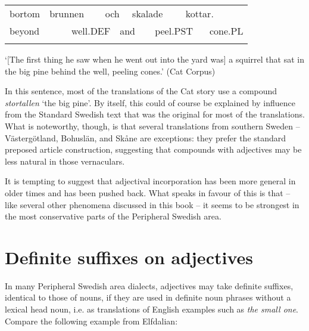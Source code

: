 \begin{tabular}{llllllllll}
\lsptoprule
bortom & \multicolumn{2}{l}{brunnen

} & \multicolumn{2}{l}{och

} & \multicolumn{2}{l}{skalade

} & \multicolumn{2}{l}{kottar.

} & \\
\multicolumn{2}{l}{beyond

} & \multicolumn{2}{l}{well.DEF

} & \multicolumn{2}{l}{and

} & \multicolumn{2}{l}{peel.PST

} & \multicolumn{2}{l}{cone.PL

}\\
\lspbottomrule
\end{tabular}

\begin{styleTranslation}
‘[The first thing he saw when he went out into the yard was] a squirrel that sat in the big pine behind the well, peeling cones.’ (Cat Corpus)

\end{styleTranslation}

\begin{styleBodyTextFirst}
In this sentence, most of the translations of the Cat story use a compound \textit{stortallen} ‘the big pine’. By itself, this could of course be explained by influence from the Standard Swedish text that was the original for most of the translations. What is noteworthy, though, is that several translations from southern Sweden – Västergötland, Bohuslän, and Skåne are exceptions: they prefer the standard preposed article construction, suggesting that compounds with adjectives may be less natural in those vernaculars.

\end{styleBodyTextFirst}

\begin{styleBodytextC}
It is tempting to suggest that adjectival incorporation has been more general in older times and has been pushed back. What speaks in favour of this is that – like several other phenomena discussed in this book – it seems to be strongest in the most conservative parts of the Peripheral Swedish area. 

\end{styleBodytextC}

\section{Definite suffixes on adjectives}
\label{bkm:Ref155519944}
\begin{styleBodyTextFirst}
In many Peripheral Swedish area dialects, adjectives may take definite suffixes, identical to those of nouns, if they are used in definite noun phrases without a lexical head noun, i.e. as translations of English examples such as \textit{the small one}. Compare the following example from Elfdalian:

\end{styleBodyTextFirst}

